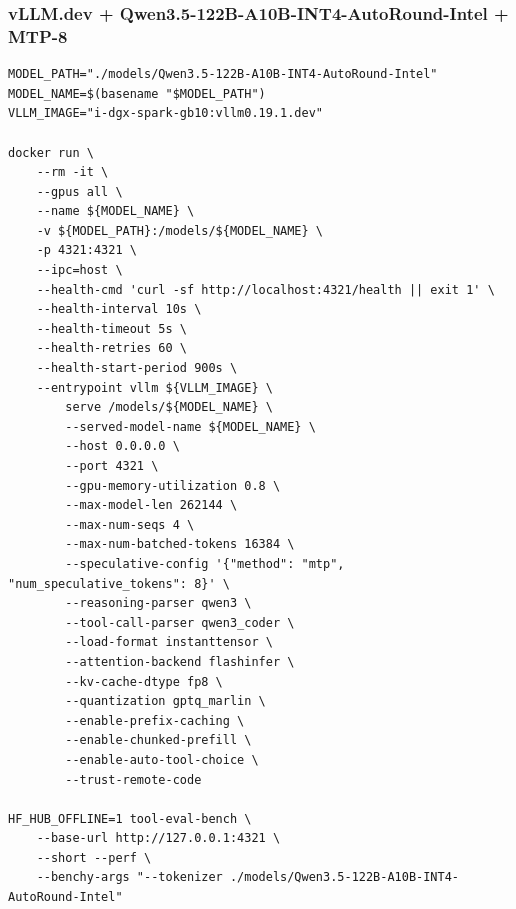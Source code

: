 \documentclass{article}
\begin{document}
\subsubsection{vLLM.dev + Qwen3.5-122B-A10B-INT4-AutoRound-Intel + MTP-8}
\begin{lstlisting}
MODEL_PATH="./models/Qwen3.5-122B-A10B-INT4-AutoRound-Intel"
MODEL_NAME=$(basename "$MODEL_PATH")
VLLM_IMAGE="i-dgx-spark-gb10:vllm0.19.1.dev"

docker run \
    --rm -it \
    --gpus all \
    --name ${MODEL_NAME} \
    -v ${MODEL_PATH}:/models/${MODEL_NAME} \
    -p 4321:4321 \
    --ipc=host \
    --health-cmd 'curl -sf http://localhost:4321/health || exit 1' \
    --health-interval 10s \
    --health-timeout 5s \
    --health-retries 60 \
    --health-start-period 900s \
    --entrypoint vllm ${VLLM_IMAGE} \
        serve /models/${MODEL_NAME} \
        --served-model-name ${MODEL_NAME} \
        --host 0.0.0.0 \
        --port 4321 \
        --gpu-memory-utilization 0.8 \
        --max-model-len 262144 \
        --max-num-seqs 4 \
        --max-num-batched-tokens 16384 \
        --speculative-config '{"method": "mtp", "num_speculative_tokens": 8}' \
        --reasoning-parser qwen3 \
        --tool-call-parser qwen3_coder \
        --load-format instanttensor \
        --attention-backend flashinfer \
        --kv-cache-dtype fp8 \
        --quantization gptq_marlin \
        --enable-prefix-caching \
        --enable-chunked-prefill \
        --enable-auto-tool-choice \
        --trust-remote-code

HF_HUB_OFFLINE=1 tool-eval-bench \
    --base-url http://127.0.0.1:4321 \
    --short --perf \
    --benchy-args "--tokenizer ./models/Qwen3.5-122B-A10B-INT4-AutoRound-Intel"
\end{lstlisting}
\end{document}
